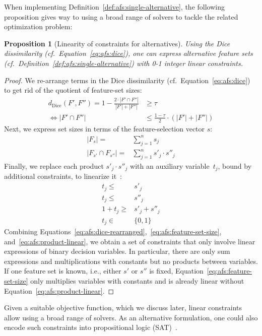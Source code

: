 \documentclass{article}
\newtheorem{proposition}{Proposition}
\theoremstyle{definition}
\begin{document}
When implementing Definition~\ref{def:afs:single-alternative}, the following proposition gives way to using a broad range of solvers to tackle the related optimization problem:
%
\begin{proposition}[Linearity of constraints for alternatives]
	Using the Dice dissimilarity (cf.~Equation~\ref{eq:afs:dice}), one can express alternative feature sets (cf.~Definition~\ref{def:afs:single-alternative}) with 0-1 integer linear constraints.
	\label{prop:afs:linear-constraints}
\end{proposition}
%
\begin{proof}
We re-arrange terms in the Dice dissimilarity (cf.~Equation~\ref{eq:afs:dice}) to get rid of the quotient of feature-set sizes:
%
\begin{equation}
	\begin{aligned}
		d_{\text{Dice}}(F',F'') = 1 - \frac{2 \cdot |F' \cap F''|}{|F'| + |F''|} &\geq \tau \\
		\Leftrightarrow |F' \cap F''| &\leq \frac{1 - \tau}{2} \cdot (|F'| + |F''|)
	\end{aligned}
	\label{eq:afs:dice-rearranged}
\end{equation}
%
Next, we express set sizes in terms of the feature-selection vector $s$:
%
\begin{equation}
	\begin{aligned}
		|F_s| =& \sum_{j=1}^n s_j \\
		|F_{s'} \cap F_{s''}| =& \sum_{j=1}^n s'_j \cdot s''_j
	\end{aligned}
	\label{eq:afs:feature-set-size}
\end{equation}
%
Finally, we replace each product $s'_j \cdot s''_j$ with an auxiliary variable~$t_j$, bound by additional constraints, to linearize it~\cite{mosek2022modeling}:
%
\begin{equation}
	\begin{aligned}
		t_j \leq& s'_j \\
		t_j \leq& s''_j \\
		1 + t_j \geq& s'_j + s''_j \\
		t_j \in& \{0,1\}
	\end{aligned}
	\label{eq:afs:product-linear}
\end{equation}
%
Combining Equations~\ref{eq:afs:dice-rearranged},~\ref{eq:afs:feature-set-size}, and~\ref{eq:afs:product-linear}, we obtain a set of constraints that only involve linear expressions of binary decision variables.
In particular, there are only sum expressions and multiplications with constants but no products between variables.
If one feature set is known, i.e., either $s'$ or $s''$ is fixed, Equation~\ref{eq:afs:feature-set-size} only multiplies variables with constants and is already linear without Equation~\ref{eq:afs:product-linear}.
\end{proof}
%
Given a suitable objective function, which we discuss later, linear constraints allow using a broad range of solvers.
As an alternative formulation, one could also encode such constraints into propositional logic (\textsc{SAT})~\cite{ulrich2022selecting}.
\end{document}
